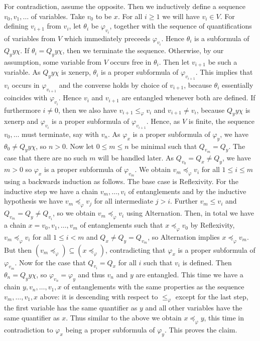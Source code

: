 \documentclass{LMCS}
\renewcommand{\phi}{\varphi}
\newcommand{\refl}{Reflexivity}
\newcommand{\alt}{Alternation}
\begin{document}
\proof
For contradiction, assume the opposite. 
Then we inductively define a sequence $v_0,v_1,\ldots$ of variables. 
Take $v_0$ to be $x$. For all $i\geq 1$ we will have $v_i\in V$. 
For defining $v_{i+1}$ from $v_i$, 
let $\theta_i$ be $\phi_{v_i}$, 
together with the sequence of quantifications of variables from $V$ 
which immediately preceeds $\phi_{v_i}$. 
Hence $\theta_i$ is a subformula of $Q_yy\chi$. 
If $\theta_i=Q_yy\chi$, then we terminate the sequence. 
Otherwise, by our assumption, 
some variable from $V$ occurs free in $\theta_i$. 
Then let $v_{i+1}$ be such a variable. 
As $Q_yy\chi$ is xenerp, 
$\theta_i$ is a proper subformula of $\phi_{v_{i+1}}$. 
This implies that $v_i$ occurs in $\phi_{v_{i+1}}$ 
and the converse holds by choice of $v_{i+1}$, 
because $\theta_i$ essentially coincides with $\phi_{v_i}$. 
Hence $v_i$ and $v_{i+1}$ are entangled whenever both are defined. 
If furthermore $i\not=0$, 
then we also have $v_{i+1}\leq_{\phi} v_i$ and $v_{i+1}\not=v_i$, 
because $Q_yy\chi$ is xenerp 
and $\phi_{v_i}$ is a proper subformula of $\phi_{v_{i+1}}$. 
Hence, as $V$ is finite, the sequence $v_0,\ldots$ must terminate, 
say with $v_n$. 
As $\phi_x$ is a proper subformula of $\phi_y$, 
we have $\theta_0\not=Q_yy\chi$, so $n>0$. 
Now let $0\leq m\leq n$ be minimal such that $Q_{v_m}=Q_y$. 
The case that there are no such $m$ will be handled later. 
As $Q_{v_0}=Q_x\not=Q_y$, we have $m>0$ 
so $\phi_x$ is a proper subformula of $\phi_{v_m}$. 
We obtain $v_m\preceq_{\phi}v_i$ for all $1\leq i\leq m$ 
using a backwards induction as follows. 
The base case is \refl. 
For the inductive step we have a chain $v_m,\ldots,v_i$ of entanglements 
and by the inductive hypothesis we have $v_m\preceq_{\phi}v_j$ 
for all intermediate $j>i$. 
Further $v_m\leq v_i$ and $Q_{v_m}=Q_y\not=Q_{v_i}$, 
so we obtain $v_m\preceq_{\phi}v_i$ using \alt. 
Then, in total we have a chain $x=v_0,v_1,\ldots,v_m$ of entanglements 
such that $x\preceq_{\phi}v_0$ by \refl, 
$v_m\preceq_{\phi}v_i$ for all $1\leq i<m$ 
and $Q_x\not=Q_y=Q_{v_m}$, so \alt{} implies $x\preceq_{\phi}v_m$. 
But then $(v_m\preceq_{\phi})\subseteq(x\preceq_{\phi})$, 
contradicting that $\phi_x$ is a proper subformula of $\phi_{v_m}$. 
Now for the case that $Q_{v_i}=Q_x$ for all $i$ such that $v_i$ is defined. 
Then $\theta_n=Q_yy\chi$, so $\phi_{v_n}=\phi_y$ 
and thus $v_n$ and $y$ are entangled. 
This time we have a chain $y,v_n,\ldots,v_1,x$ of entanglements 
with the same properties as the sequence $v_m,\ldots,v_1,x$ above: 
it is descending with respect to $\leq_{\phi}$ except for the last step, 
the first variable has the same quantifier as $y$ 
and all other variables have the same quantifier as $x$. 
Thus similar to the above we obtain $x\preceq_{\phi}y$, 
this time in contradiction to $\phi_x$ being a proper subformula of $\phi_y$. 
This proves the claim.
\cqed
\end{document}
